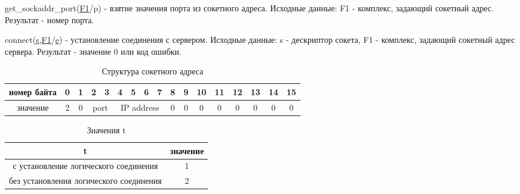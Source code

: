 \documentclass[12t,english,russian]{article}
\begin{document}
get\_sockaddr\_port(\hyperref[sockaddr]{F1}/p) - взятие значения порта из сокетного адреса. Исходные данные: F1 - комплекс, задающий сокетный адрес. Результат - номер порта.

\label{connect}
connect(\hyperref[socket]{s},\hyperref[sockaddr]{F1}/\hyperref[error]{e}) - установление соединения с сервером. Исходные данные: s - дескриптор сокета, F1 - комплекс, задающий сокетный адрес сервера. Результат - значение 0 или код ошибки.

\begin{table}[H]
\caption{\label{sockaddr}Структура сокетного адреса}
\begin{center}
\begin{tabular}{|c|c|c|c|c|c|c|c|c|c|c|c|c|c|c|c|c|}
\hline
номер байта & 0 & 1 & 2 & 3 & 4 & 5 & 6 & 7 & 8 & 9 & 10 & 11 & 12 & 13 & 14 & 15 \\
\hline
значение & 2 & 0 & \multicolumn{2}{|c|}{port} & \multicolumn{4}{|c|}{IP address} & 0 & 0 & 0 & 0 & 0 & 0 & 0 & 0 \\
\hline
\end{tabular}
\end{center}
\end{table}

\begin{table}[ht]
\caption{\label{type}Значения t}
\begin{center}
\begin{tabular}{|c|c|}
\hline
t & значение \\
\hline
с установление логического соединения & 1 \\
без установления логического соединения & 2 \\
\hline
\end{tabular}
\end{center}
\end{table}
\end{document}
